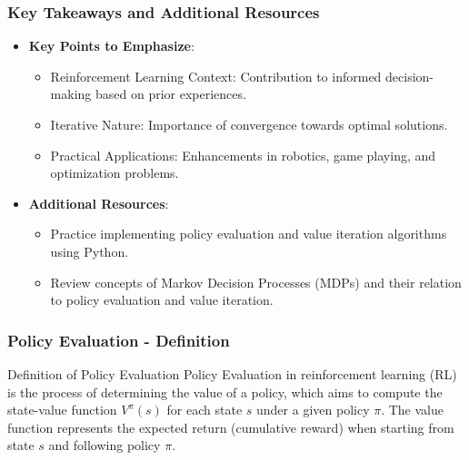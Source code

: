 \documentclass[aspectratio=169]{beamer}
\begin{document}
\begin{frame}[fragile]
    \frametitle{Key Takeaways and Additional Resources}
    \begin{itemize}
        \item \textbf{Key Points to Emphasize}:
        \begin{itemize}
            \item Reinforcement Learning Context: Contribution to informed decision-making based on prior experiences.
            \item Iterative Nature: Importance of convergence towards optimal solutions.
            \item Practical Applications: Enhancements in robotics, game playing, and optimization problems.
        \end{itemize}
        \item \textbf{Additional Resources}:
        \begin{itemize}
            \item Practice implementing policy evaluation and value iteration algorithms using Python.
            \item Review concepts of Markov Decision Processes (MDPs) and their relation to policy evaluation and value iteration.
        \end{itemize}
    \end{itemize}
\end{frame}

\begin{frame}[fragile]
    \frametitle{Policy Evaluation - Definition}
    \begin{block}{Definition of Policy Evaluation}
        Policy Evaluation in reinforcement learning (RL) is the process of determining the value of a policy, which aims to compute the state-value function \( V^\pi(s) \) for each state \( s \) under a given policy \( \pi \).
        The value function represents the expected return (cumulative reward) when starting from state \( s \) and following policy \( \pi \).
    \end{block}
\end{frame}
\end{document}
